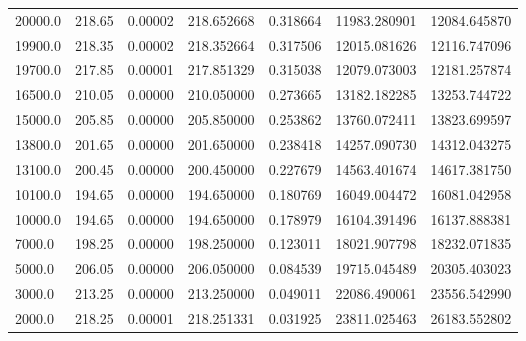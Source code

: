 \begin{tabular}{lllllll}
   20000.0 &   218.65 & 0.00002 &    218.652668 &          0.318664 & 11983.280901 & 12084.645870 \\
   19900.0 &   218.35 & 0.00002 &    218.352664 &          0.317506 & 12015.081626 & 12116.747096 \\
   19700.0 &   217.85 & 0.00001 &    217.851329 &          0.315038 & 12079.073003 & 12181.257874 \\
   16500.0 &   210.05 & 0.00000 &    210.050000 &          0.273665 & 13182.182285 & 13253.744722 \\
   15000.0 &   205.85 & 0.00000 &    205.850000 &          0.253862 & 13760.072411 & 13823.699597 \\
   13800.0 &   201.65 & 0.00000 &    201.650000 &          0.238418 & 14257.090730 & 14312.043275 \\
   13100.0 &   200.45 & 0.00000 &    200.450000 &          0.227679 & 14563.401674 & 14617.381750 \\
   10100.0 &   194.65 & 0.00000 &    194.650000 &          0.180769 & 16049.004472 & 16081.042958 \\
   10000.0 &   194.65 & 0.00000 &    194.650000 &          0.178979 & 16104.391496 & 16137.888381 \\
    7000.0 &   198.25 & 0.00000 &    198.250000 &          0.123011 & 18021.907798 & 18232.071835 \\
    5000.0 &   206.05 & 0.00000 &    206.050000 &          0.084539 & 19715.045489 & 20305.403023 \\
    3000.0 &   213.25 & 0.00000 &    213.250000 &          0.049011 & 22086.490061 & 23556.542990 \\
    2000.0 &   218.25 & 0.00001 &    218.251331 &          0.031925 & 23811.025463 & 26183.552802 \\
\bottomrule
\end{tabular}
